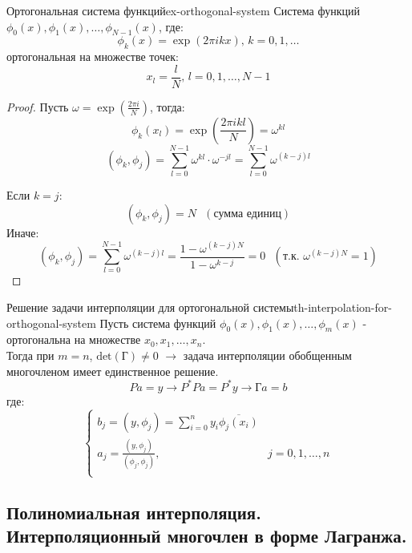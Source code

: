 \documentclass[14pt]{extarticle}
\begin{document}
    \clearpage
    \begin{example}{Ортогональная система функций}{ex-orthogonal-system}
        Система функций $\phi_{0}(x), \phi_{1}(x), \ldots, \phi_{N-1}(x)$, где:
        $$\phi_{k}(x) = \exp(2\pi ikx) \text{, } k = 0, 1, \ldots$$
        ортогональная на множестве точек:
        $$x_{l} = \frac{l}{N} \text{, } l=0, 1, \ldots, N-1$$
    
        \begin{proof}
            Пусть $\omega = \exp(\frac{2\pi i}{N})$, тогда:
            $$\phi_{k}(x_{l}) = \exp(\frac{2\pi ikl}{N}) = \omega^{kl}$$
            $$(\phi_{k}, \phi_{j}) = \sum_{l = 0}^{N-1} \omega^{kl} \cdot \omega^{-jl} = \sum_{l = 0}^{N-1} \omega^{(k - j)l}$$
            
            Если $k = j$:
            $$(\phi_{k}, \phi_{j}) = N \text{ } (\text{сумма единиц})$$
            Иначе:
            $$(\phi_{k}, \phi_{j}) = \sum_{l = 0}^{N - 1} \omega^{(k - j)l} = \frac{1 - \omega^{(k - j)N}}{1 - \omega^{k - j}} = 0 \text{ } (\text{т.к. } \omega^{(k - j)N} = 1)$$
        \end{proof}
    \end{example}

    \begin{theorem}{Решение задачи интерполяции для ортогональной системы}{th-interpolation-for-orthogonal-system}
        Пусть система функций $\phi_{0}(x), \phi_{1}(x), \ldots, \phi_{m}(x)$ - ортогональна на множестве $x_{0}, x_{1}, \ldots, x_{n}$.\\
        Тогда при $m = n$, $\text{det}(\text{Г}) \neq 0$ $\rightarrow$ задача интерполяции обобщенным многочленом имеет единственное решение.
        $$Pa = y \rightarrow P^{*}Pa = P^{*}y \rightarrow \text{Г}a = b$$
        где: 
        $$
        \begin{cases}
            b_{j} = (y, \phi_{j}) = \sum_{i = 0}^{n} y_{i}\overline{\phi_{j}(x_{i})}\\
            a_{j} = \frac{(y, \phi_{j})}{(\phi_{j}, \phi_{j})}, & j = 0, 1, \ldots, n \\
        \end{cases}
        $$
    \end{theorem}

\clearpage
\subsection{Полиномиальная интерполяция. Интерполяционный многочлен в форме Лагранжа.}
\end{document}
